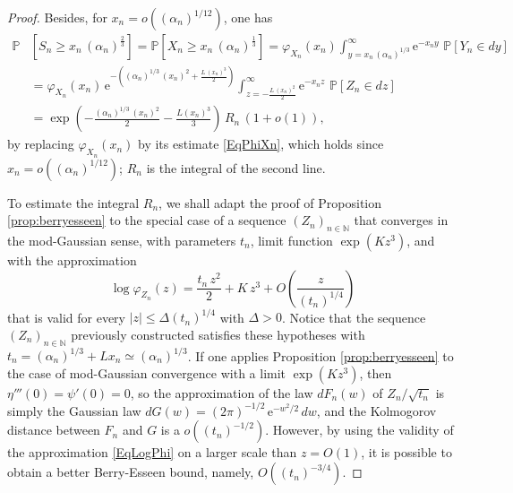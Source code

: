 \documentclass[12pt,a4paper,reqno]{amsart}
\theoremstyle{remark}
\newcommand{\N}{\mathbb{N}}
\newcommand{\E}{\mathrm{e}}
\newcommand{\proba}{\mathbb{P}}
\newcommand{\alphan}{\alpha_n}
\begin{document}
\begin{proof}
Besides, for $x_n=o((\alphan)^{1/12})$, one has
\begin{align*}
\proba&\!\left[S_{n} \geq x_{n}\,(\alphan)^{\frac{2}{3}}\right]=\proba\!\left[X_{n} \geq x_n\,(\alphan)^{\frac{1}{3}}\right]=\varphi_{X_{n}}(x_n)\int_{y=x_n\,(\alphan)^{1/3}}^{\infty}\E^{-x_ny}\,\,\proba[Y_{n} \in dy]\\
&=\varphi_{X_{n}}(x_n)\,\E^{-\left((\alphan)^{1/3}\,(x_{n})^{2}+\frac{L\,(x_{n})^{3}}{2}\right)}\!\!\int_{z=-\frac{L\,(x_{n})^{2}}{2}}^{\infty} \E^{-x_n z}\, \,\proba[Z_{n} \in dz]\\
&=\exp\left(-\frac{(\alphan)^{1/3}\,(x_n)^{2}}{2}-\frac{L(x_n)^3}{3}\right)\,R_{n}\,(1+o(1)),
\end{align*}
by replacing $\varphi_{X_n}(x_n)$ by its estimate \eqref{EqPhiXn}, which holds since $x_n=o((\alphan)^{1/12})$; $R_n$ is the integral of the second line.\bigskip

To estimate the integral $R_n$, we shall adapt the proof of Proposition \ref{prop:berryesseen} to the special case of a sequence $(Z_n)_{n \in \N}$ that converges in the mod-Gaussian sense, with parameters $t_n$, limit function $\exp(Kz^3)$, and with the approximation
\begin{equation}
\log \varphi_{Z_n}(z) = \frac{t_n\,z^2}{2} + K\,z^3 + O\!\left(\frac{z}{(t_n)^{1/4}}\right)
\label{EqLogPhi}
\end{equation}
that is valid for every $|z| \leq \Delta (t_n)^{1/4}$ with $\Delta>0$. Notice that the sequence $(Z_n)_{n \in \N}$ previously constructed satisfies these hypotheses with $t_n = (\alphan)^{1/3} + Lx_n \simeq (\alphan)^{1/3}$. If one applies Proposition \ref{prop:berryesseen} to the case of mod-Gaussian convergence with a limit $\exp(Kz^3)$, then $\eta'''(0)=\psi'(0)=0$, so the approximation of the law $dF_n(w)$ of $Z_n/\sqrt{t_n}$ is simply the Gaussian law $dG(w) = (2\pi)^{-1/2}\,\E^{-w^2/2}\,dw$, and the Kolmogorov distance between $F_n$ and $G$ is a $o((t_n)^{-1/2})$. However, by using the validity of the approximation \eqref{EqLogPhi} on a larger scale than $z=O(1)$, it is possible to obtain a better Berry-Esseen bound, namely, $O((t_n)^{-3/4})$.\bigskip


\end{proof}
\end{document}
